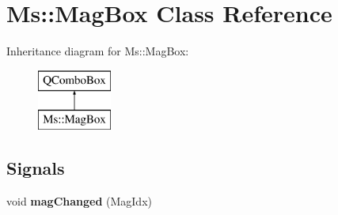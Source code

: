 \hypertarget{class_ms_1_1_mag_box}{}\section{Ms\+:\+:Mag\+Box Class Reference}
\label{class_ms_1_1_mag_box}
Inheritance diagram for Ms\+:\+:Mag\+Box\+:\begin{figure}[H]
\begin{center}
\leavevmode
\includegraphics[height=2.000000cm]{class_ms_1_1_mag_box}
\end{center}
\end{figure}
\subsection*{Signals}
\begin{DoxyCompactItemize}
\item 
\mbox{\label{class_ms_1_1_mag_box_aa5e9a540c7be6933329216d2ffedd517}} 
void {\bfseries mag\+Changed} (Mag\+Idx)
\end{DoxyCompactItemize}
